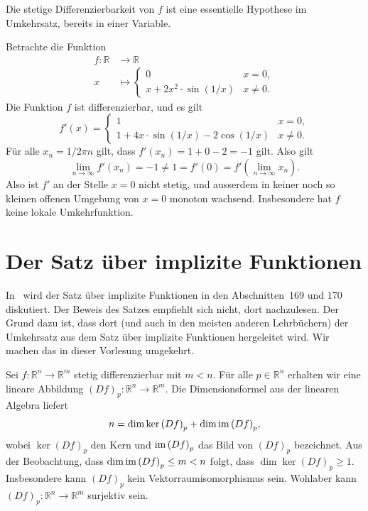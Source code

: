 \documentclass[../main.tex]{subfiles}
\begin{document}
\begin{remark}
  Die stetige Differenzierbarkeit von $f$ 
  ist eine essentielle Hypothese im Umkehrsatz,
  bereits in einer Variable.
\end{remark}

\begin{example}
  Betrachte die Funktion
  \begin{align*}
    f \colon \mathbb{R} & \to \mathbb{R} \\
    x & \mapsto 
    \begin{cases}
      0 & x = 0, \\
      x + 2x^2 \cdot \sin(1/x) & x \neq 0.
    \end{cases}
  \end{align*}
  Die Funktion $f$ ist differenzierbar, und es gilt
  \[
    f'(x) =
    \begin{cases}
      1 & x = 0, \\
      1 + 4x \cdot \sin(1/x) - 2 \cos(1/x) & x \neq 0.
    \end{cases}
  \]
  Für alle $x_n = 1/2\pi n$ gilt, dass $f'(x_n) = 1 + 0 - 2 = -1$ gilt.
  Also gilt
  \[
    \lim_{n \to \infty} f'(x_n) = -1 \neq 1 = f'(0)
    = f' \left( \lim_{n \to \infty} x_n \right).
  \]
  Also ist $f'$ an der Stelle $x = 0$ nicht stetig, und
  ausserdem in keiner noch so kleinen offenen Umgebung
  von $x = 0$ monoton wachsend.
  Insbesondere hat $f$ keine lokale Umkehrfunktion.
\end{example}

\section{Der Satz über implizite Funktionen}
In~\cite{heuser} wird der Satz über implizite Funktionen 
in den Abschnitten~169 und 170 diskutiert.
Der Beweis des Satzes empfiehlt sich nicht, dort nachzulesen.
Der Grund dazu ist, dass dort (und auch in den meisten
anderen Lehrbüchern) der 
Umkehrsatz aus dem Satz über implizite Funktionen
hergeleitet wird. Wir machen das in dieser Vorlesung umgekehrt. 

Sei $f \colon \mathbb{R}^n \to \mathbb{R}^m$ 
stetig differenzierbar mit $m < n$.
Für alle $p \in \mathbb{R}^n$ erhalten wir eine
lineare Abbildung ${(Df)}_p \colon \mathbb{R}^n \to \mathbb{R}^m$.
Die Dimensionsformel aus der linearen Algebra liefert
\[
  n = \dim \ker {(Df)}_p + \dim \operatorname{im} {(Df)}_p,
\]
wobei $\ker {(Df)}_p$ den Kern und
$\operatorname{im} {(Df)}_p$ das Bild von ${(Df)}_p$ bezeichnet.
Aus der Beobachtung, dass
$\dim \operatorname{im} {(Df)}_p \leq m < n$ folgt, dass
$\dim \ker {(Df)}_p \geq 1$.
Insbesondere kann ${(Df)}_p$ kein Vektorraumisomorphismus sein.
Wohlaber kann ${(Df)}_p \colon \mathbb{R}^n \to \mathbb{R}^m$ 
surjektiv sein.
\end{document}
